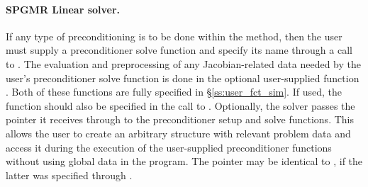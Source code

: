 \noindent\paragraph{\bf SPGMR Linear solver.}
If any type of preconditioning is to be done within the {\spgmr} method,
then the user must supply a preconditioner solve function 
and specify its name through a call to .
The evaluation and preprocessing of any Jacobian-related data needed
by the user's preconditioner solve function is done in the optional
user-supplied function . Both of these functions are
fully specified in \S\ref{ss:user_fct_sim}.
If used, the  function should also be specified in the call to
.
Optionally, the {\cvspgmr} solver passes the pointer it receives through 
 to the preconditioner setup and solve functions.  
This allows the user to create an arbitrary structure with relevant problem data 
and access it during the execution of the user-supplied preconditioner functions
without using global data in the program.  
The pointer  may be identical to , if the latter was 
specified through .

